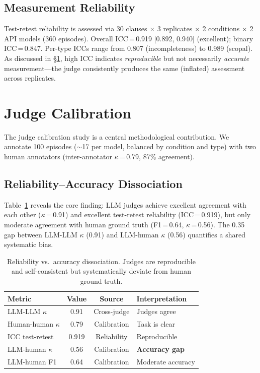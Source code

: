 \documentclass[11pt]{article}
\begin{document}
\subsection{Measurement Reliability}

Test-retest reliability is assessed via 30 clauses $\times$ 3 replicates $\times$ 2 conditions $\times$ 2 API models (360 episodes).
Overall ICC\,=\,0.919 [0.892, 0.940] (excellent); binary ICC\,=\,0.847.
Per-type ICCs range from 0.807 (incompleteness) to 0.989 (scopal).
As discussed in \S\ref{sec:judge_cal}, high ICC indicates \emph{reproducible} but not necessarily \emph{accurate} measurement---the judge consistently produces the same (inflated) assessment across replicates.

\section{Judge Calibration}
\label{sec:judge_cal}

The judge calibration study is a central methodological contribution.
We annotate 100 episodes ($\sim$17 per model, balanced by condition and type) with two human annotators (inter-annotator $\kappa$\,=\,0.79, 87\% agreement).

\subsection{Reliability--Accuracy Dissociation}

Table~\ref{tab:dissociation} reveals the core finding: LLM judges achieve excellent agreement with each other ($\kappa$\,=\,0.91) and excellent test-retest reliability (ICC\,=\,0.919), but only moderate agreement with human ground truth (F1\,=\,0.64, $\kappa$\,=\,0.56).
The 0.35 gap between LLM-LLM $\kappa$ (0.91) and LLM-human $\kappa$ (0.56) quantifies a shared systematic bias.

\begin{table}[t]
\centering
\small
\begin{tabular}{lccl}
\toprule
\textbf{Metric} & \textbf{Value} & \textbf{Source} & \textbf{Interpretation} \\
\midrule
LLM-LLM $\kappa$ & 0.91 & Cross-judge & Judges agree \\
Human-human $\kappa$ & 0.79 & Calibration & Task is clear \\
ICC test-retest & 0.919 & Reliability & Reproducible \\
LLM-human $\kappa$ & 0.56 & Calibration & \textbf{Accuracy gap} \\
LLM-human F1 & 0.64 & Calibration & Moderate accuracy \\
\bottomrule
\end{tabular}
\caption{Reliability vs.\ accuracy dissociation. Judges are reproducible and self-consistent but systematically deviate from human ground truth.}
\label{tab:dissociation}
\end{table}
\end{document}
